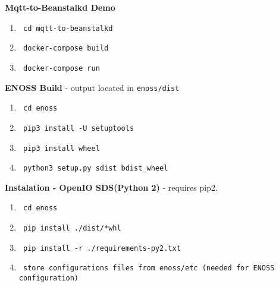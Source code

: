 \textbf{Mqtt-to-Beanstalkd Demo}
\begin{enumerate}
    \item \begin{verbatim} cd mqtt-to-beanstalkd\end{verbatim}
    \item \begin{verbatim} docker-compose build\end{verbatim}
    \item \begin{verbatim} docker-compose run\end{verbatim}
\end{enumerate}

\textbf{ENOSS Build} - output located in \texttt{enoss/dist}
\begin{enumerate}
    \item \begin{verbatim} cd enoss\end{verbatim}
    \item \begin{verbatim} pip3 install -U setuptools\end{verbatim}
    \item \begin{verbatim} pip3 install wheel\end{verbatim}
    \item \begin{verbatim} python3 setup.py sdist bdist_wheel\end{verbatim}
\end{enumerate}

\textbf{Instalation - OpenIO SDS(Python 2)} - requires pip2.
\begin{enumerate}
    \item \begin{verbatim} cd enoss \end{verbatim}
    \item \begin{verbatim} pip install ./dist/*whl\end{verbatim}
    \item \begin{verbatim} pip install -r ./requirements-py2.txt\end{verbatim}
    \item \begin{verbatim} store configurations files from enoss/etc (needed for ENOSS configuration)\end{verbatim}
\end{enumerate}


